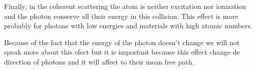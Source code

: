 Finally, in the coherent scattering the atom is neither excitation nor ionization and the photon conserve all their energy in this collision. This effect is more probably for photons with low energies and materials with high atomic numbers.

Because of the fact that the energy of the photon doesn't change we will not speak more about this efect but it is important because this effect change de direction of photons and it will affect to their mean free path.